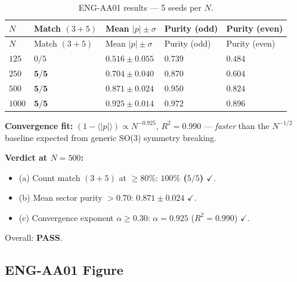 \documentclass[12pt, a4paper]{article}
\begin{document}
\begin{derivedbox}[title={ENG-AA01 Aggregated Results}]
{\small
\setlength{\LTpre}{4pt}
\setlength{\LTpost}{4pt}
\renewcommand{\arraystretch}{1.30}
\begin{longtable}{>{\centering\arraybackslash}p{1.4cm}
                  >{\centering\arraybackslash}p{2.5cm}
                  >{\centering\arraybackslash}p{3.5cm}
                  >{\centering\arraybackslash}p{2.5cm}
                  >{\centering\arraybackslash}p{2.5cm}}
\caption{ENG-AA01 results --- 5 seeds per $N$.}\\
\toprule
$N$ & Match $(3+5)$ & Mean $|p| \pm \sigma$ &
Purity (odd) & Purity (even) \\
\midrule
\endfirsthead
\toprule
$N$ & Match $(3+5)$ & Mean $|p| \pm \sigma$ &
Purity (odd) & Purity (even) \\
\midrule
\endhead
\bottomrule
\endlastfoot
$125$ & $0/5$ & $0.516 \pm 0.055$ & $0.739$ & $0.484$ \\
$250$ & $\mathbf{5/5}$ & $0.704 \pm 0.040$ & $0.870$ & $0.604$ \\
$500$ & $\mathbf{5/5}$ & $0.871 \pm 0.024$ & $0.950$ & $0.824$ \\
$1000$ & $\mathbf{5/5}$ & $0.925 \pm 0.014$ & $0.972$ & $0.896$ \\
\end{longtable}
}

\textbf{Convergence fit:}
$(1 - \langle |p| \rangle) \propto N^{-0.925}$, $R^2 = 0.990$ ---
\emph{faster} than the $N^{-1/2}$ baseline expected from generic
SO(3) symmetry breaking.

\textbf{Verdict at $N = 500$:}
\begin{itemize}[leftmargin=*]
\item (a) Count match $(3 + 5)$ at $\ge 80\%$: \textbf{$100\%$
  ($5/5$) \Large$\checkmark$}.
\item (b) Mean sector purity $> 0.70$: $\mathbf{0.871 \pm 0.024}$
  $\checkmark$.
\item (c) Convergence exponent $\alpha \ge 0.30$: $\alpha = 0.925$
  ($R^2 = 0.990$) $\checkmark$.
\end{itemize}
Overall: \textbf{PASS}.
\end{derivedbox}

\subsection{ENG-AA01 Figure}
\end{document}
